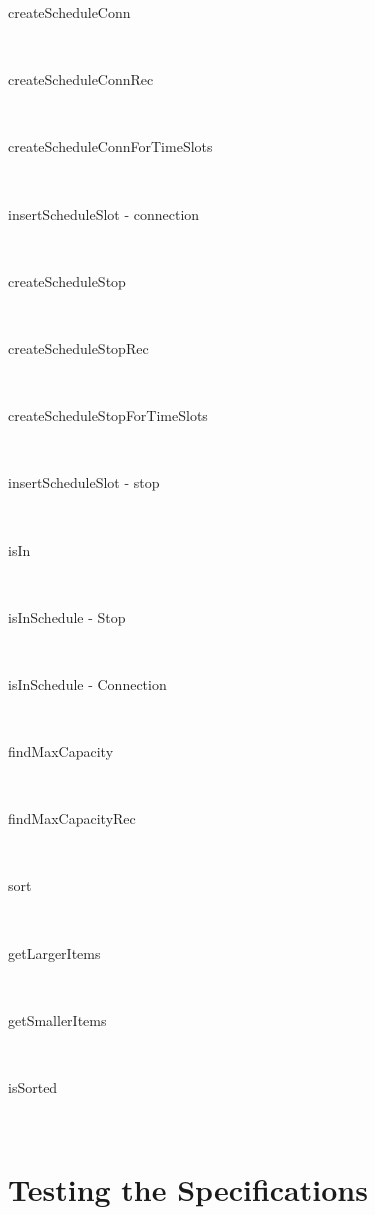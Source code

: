 \documentclass[a4]{article}
\begin{document}
\begin{description}
    \item[createScheduleConn] \hfill \\ 
    \item[createScheduleConnRec] \hfill \\ 
    \item[createScheduleConnForTimeSlots] \hfill \\ 
    \item[insertScheduleSlot - connection] \hfill \\ 
    \item[createScheduleStop] \hfill \\ 
    \item[createScheduleStopRec] \hfill \\ 
    \item[createScheduleStopForTimeSlots] \hfill \\ 
    \item[insertScheduleSlot - stop] \hfill \\ 
\end{description}

\begin{description}
    \item[isIn] \hfill \\ 
    \item[isInSchedule - Stop] \hfill \\ 
    \item[isInSchedule - Connection] \hfill \\ 
    \item[findMaxCapacity] \hfill \\ 
    \item[findMaxCapacityRec] \hfill \\ 
    \item[sort] \hfill \\ 
    \item[getLargerItems] \hfill \\
    \item[getSmallerItems] \hfill \\
    \item[isSorted] \hfill \\ 
\end{description}

\section{Testing the Specifications}
\end{document}

